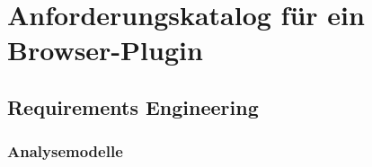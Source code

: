 
\chapter{Anforderungskatalog für ein Browser-Plugin}
\label{chap:Anforderungskatalog}

\section{Requirements Engineering}
\label{sec:Anforderungskatalog:req}


\subsection{Analysemodelle}
\label{sec:Anforderungskatalog:req:modelle}

